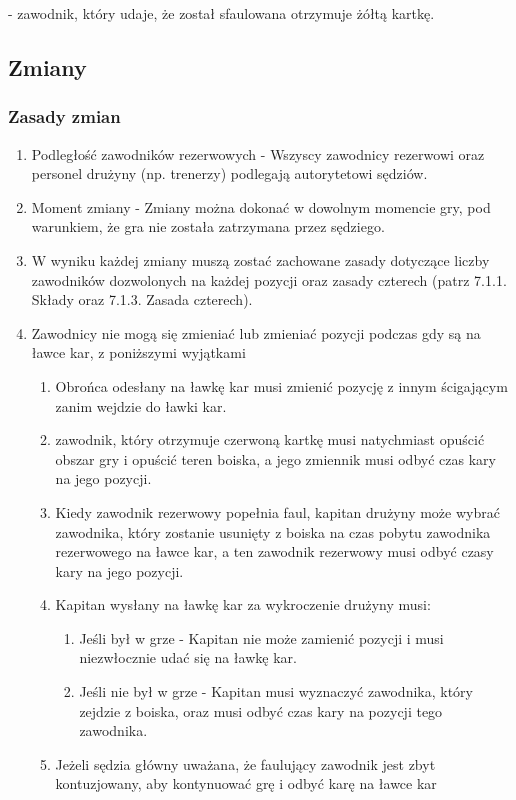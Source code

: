 \documentclass[12pt]{article}
\newcommand\yellowcard{\bgroup\color{yellow}\markoverwith{\textcolor{yellow}{\rule[-0.5ex]{2pt}{0.4pt}}}\ULon}
\begin{document}
\yellowcard{Żółta kartka} - zawodnik, który udaje, że został sfaulowana
otrzymuje żółtą kartkę.

\subsection{Zmiany}

\subsubsection{Zasady zmian}

\begin{enumerate}
	\item
	      Podległość zawodników rezerwowych - Wszyscy zawodnicy
	      rezerwowi oraz personel drużyny (np. trenerzy) podlegają autorytetowi
	      sędziów.
	\item
	      Moment zmiany - Zmiany można dokonać w dowolnym momencie gry,
	      pod warunkiem, że gra nie została zatrzymana przez sędziego.
	\item
	      W wyniku każdej zmiany muszą zostać zachowane zasady dotyczące liczby
	      zawodników dozwolonych na każdej pozycji oraz zasady czterech (patrz
	      7.1.1. Składy oraz 7.1.3. Zasada czterech).
	\item
	      Zawodnicy nie mogą się zmieniać lub zmieniać pozycji podczas gdy są na
	      ławce kar, z poniższymi wyjątkami

	      \begin{enumerate}
		      \item
		            Obrońca odesłany na ławkę kar musi zmienić pozycję z innym
		            ścigającym zanim wejdzie do ławki kar.
		      \item
		            zawodnik, który otrzymuje czerwoną kartkę musi natychmiast opuścić
		            obszar gry i opuścić teren boiska, a jego zmiennik musi odbyć czas
		            kary na jego pozycji.
		      \item
		            Kiedy zawodnik rezerwowy popełnia faul, kapitan drużyny może wybrać
		            zawodnika, który zostanie usunięty z boiska na czas pobytu zawodnika
		            rezerwowego na ławce kar, a ten zawodnik rezerwowy musi odbyć czasy
		            kary na jego pozycji.
		      \item
		            Kapitan wysłany na ławkę kar za wykroczenie drużyny musi:

		            \begin{enumerate}
			            \item
			                  Jeśli był w grze - Kapitan nie może zamienić pozycji i musi
			                  niezwłocznie udać się na ławkę kar.
			            \item
			                  Jeśli nie był w grze - Kapitan musi wyznaczyć zawodnika, który
			                  zejdzie z boiska, oraz musi odbyć czas kary na pozycji tego
			                  zawodnika.
		            \end{enumerate}
		      \item
		            Jeżeli sędzia główny uważana, że faulujący zawodnik jest zbyt
		            kontuzjowany, aby kontynuować grę i odbyć karę na ławce kar


\end{enumerate}
\end{enumerate}
\end{document}
